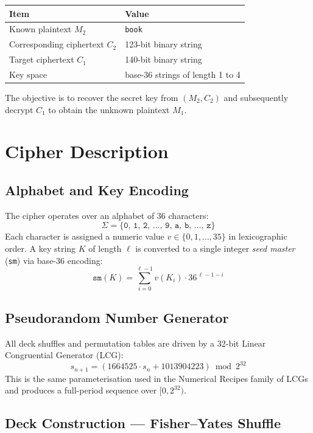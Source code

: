\documentclass[12pt,a4paper]{article}
\begin{document}
\begin{center}
\begin{tabular}{ll}
\toprule
\textbf{Item} & \textbf{Value} \\
\midrule
Known plaintext $M_2$ & \texttt{book} \\
Corresponding ciphertext $C_2$ & 123-bit binary string \\
Target ciphertext $C_1$ & 140-bit binary string \\
Key space & base-36 strings of length 1 to 4 \\
\bottomrule
\end{tabular}
\end{center}

The objective is to recover the secret key from $(M_2, C_2)$ and subsequently decrypt $C_1$ to obtain the unknown plaintext $M_1$.

\section{Cipher Description}

\subsection{Alphabet and Key Encoding}

The cipher operates over an alphabet of 36 characters:
\[
    \Sigma = \{\texttt{0, 1, 2, \ldots, 9, a, b, \ldots, z}\}
\]
Each character is assigned a numeric value $v \in \{0, 1, \ldots, 35\}$ in lexicographic order. A key string $K$ of length $\ell$ is converted to a single integer \emph{seed master} (\texttt{sm}) via base-36 encoding:
\[
    \texttt{sm}(K) = \sum_{i=0}^{\ell-1} v(K_i) \cdot 36^{\,\ell - 1 - i}
\]

\subsection{Pseudorandom Number Generator}

All deck shuffles and permutation tables are driven by a 32-bit Linear Congruential Generator (LCG):
\[
    s_{n+1} = (1664525 \cdot s_n + 1013904223) \bmod 2^{32}
\]
This is the same parameterisation used in the Numerical Recipes family of LCGs and produces a full-period sequence over $[0, 2^{32})$.

\subsection{Deck Construction — Fisher--Yates Shuffle}
\end{document}
